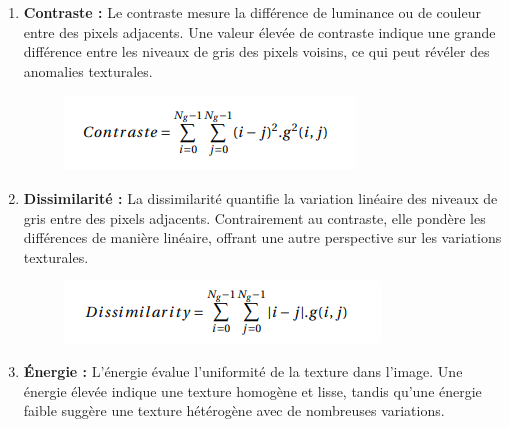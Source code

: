 \begin{enumerate}
	\item \textbf{Contraste :}
	Le contraste mesure la différence de luminance ou de couleur entre des pixels adjacents. Une valeur élevée de contraste indique une grande différence entre les niveaux de gris des pixels voisins, ce qui peut révéler des anomalies texturales.
	
	\begin{figure}[htbp]
		\begin{center}
			\begin{minipage}[b]{0.5\textwidth}
				\centering
				\includegraphics[width=\textwidth]{images/constrate.png}
			\end{minipage}
		\end{center}
	\end{figure}
	
	\item \textbf{Dissimilarité :}
	La dissimilarité quantifie la variation linéaire des niveaux de gris entre des pixels adjacents. Contrairement au contraste, elle pondère les différences de manière linéaire, offrant une autre perspective sur les variations texturales.
	
	\begin{figure}[htbp]
		\begin{center}
			\begin{minipage}[b]{0.5\textwidth}
				\centering
				\includegraphics[width=\textwidth]{images/dissimilarity.png}
			\end{minipage}
		\end{center}
	\end{figure}
	
	\item \textbf{Énergie :}
	L'énergie évalue l'uniformité de la texture dans l'image. Une énergie élevée indique une texture homogène et lisse, tandis qu'une énergie faible suggère une texture hétérogène avec de nombreuses variations.
	

\end{enumerate}
